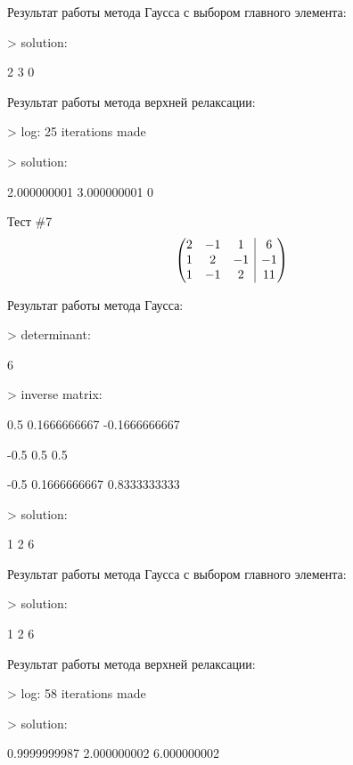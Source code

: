 \documentclass[12pt, a4paper]{report}
\makeatletter
\newenvironment{amatrix}[1]{%
        \left(\begin{array}{@{}*{#1}{c}|c@{}}
}{%
        \end{array}\right)
}
\makeatother
\begin{document}
{\vspace{0.25cm}
\normalsize{Результат работы метода Гаусса с выбором главного элемента: \par}
\normalsize{> solution: \par
            2              3            0 \par}
\vspace{0.25cm}
\normalsize{Результат работы метода верхней релаксации: \par}
\normalsize{> log: 25 iterations made \par
            > solution: \par
            2.000000001             3.000000001            0     \par}
\vspace{1cm}

\large{Тест \#7}
\[\begin{amatrix}{3}
        2 & -1 &  1 &  6 \\
        1 &  2 & -1 & -1 \\
        1 & -1 &  2 & 11 \\
\end{amatrix}\]

\normalsize{Результат работы метода Гаусса: \par}
\normalsize{> determinant: \par
            6 \par
            > inverse matrix: \par
                       0.5    0.1666666667   -0.1666666667 \par
                      -0.5             0.5             0.5 \par
                      -0.5    0.1666666667    0.8333333333 \par
            > solution: \par
                         1               2               6 \par}
\vspace{0.25cm}
\normalsize{Результат работы метода Гаусса с выбором главного элемента: \par}
\normalsize{> solution: \par
            1              2            6 \par}
\vspace{0.25cm}
\normalsize{Результат работы метода верхней релаксации: \par}
\normalsize{> log: 58 iterations made \par
            > solution: \par
            0.9999999987     2.000000002     6.000000002 \par}
\vspace{1cm}
            
}
\end{document}

